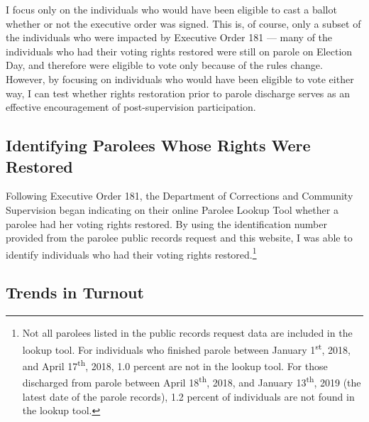 \documentclass[12pt,]{article}
\let\rmarkdownfootnote\footnote%
\def\footnote{\protect\rmarkdownfootnote}
\begin{document}
I focus only on the individuals who would have been eligible to cast a ballot whether or not the executive order was signed. This is, of course, only a subset of the individuals who were impacted by Executive Order 181 --- many of the individuals who had their voting rights restored were still on parole on Election Day, and therefore were eligible to vote only because of the rules change. However, by focusing on individuals who would have been eligible to vote either way, I can test whether rights restoration prior to parole discharge serves as an effective encouragement of post-supervision participation.

\hypertarget{identifying-parolees-whose-rights-were-restored}{%
\subsection*{Identifying Parolees Whose Rights Were Restored}\label{identifying-parolees-whose-rights-were-restored}}

Following Executive Order 181, the Department of Corrections and Community Supervision began indicating on their online Parolee Lookup Tool whether a parolee had her voting rights restored. By using the identification number provided from the parolee public records request and this website, I was able to identify individuals who had their voting rights restored.\footnote{Not all parolees listed in the public records request data are included in the lookup tool. For individuals who finished parole between January 1\textsuperscript{st}, 2018, and April 17\textsuperscript{th}, 2018, 1.0 percent are not in the lookup tool. For those discharged from parole between April 18\textsuperscript{th}, 2018, and January 13\textsuperscript{th}, 2019 (the latest date of the parole records), 1.2 percent of individuals are not found in the lookup tool.}

\hypertarget{trends-in-turnout}{%
\subsection*{Trends in Turnout}\label{trends-in-turnout}}
\end{document}
